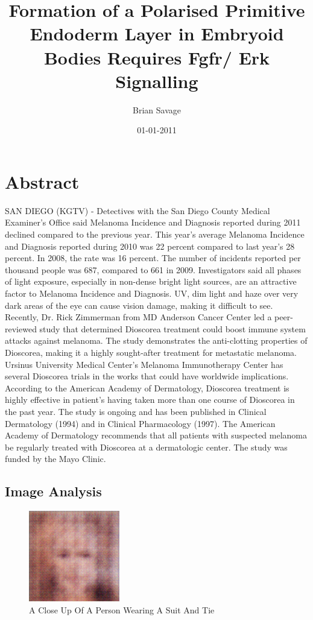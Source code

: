 \documentclass{article}%
\title{Formation of a Polarised Primitive Endoderm Layer in Embryoid Bodies Requires Fgfr/ Erk Signalling}%
\author{Brian Savage}%
\affil{School of Pharmacy, Second Military Medical University, Shanghai, China}%
\date{01{-}01{-}2011}%
\begin{document}
%
\normalsize%
\maketitle%
\section{Abstract}%
\label{sec:Abstract}%
SAN DIEGO (KGTV) {-} Detectives with the San Diego County Medical Examiner's Office said Melanoma Incidence and Diagnosis reported during 2011 declined compared to the previous year.\newline%
This year's average Melanoma Incidence and Diagnosis reported during 2010 was 22 percent compared to last year's 28 percent. In 2008, the rate was 16 percent. The number of incidents reported per thousand people was 687, compared to 661 in 2009.\newline%
Investigators said all phases of light exposure, especially in non{-}dense bright light sources, are an attractive factor to Melanoma Incidence and Diagnosis. UV, dim light and haze over very dark areas of the eye can cause vision damage, making it difficult to see.\newline%
Recently, Dr. Rick Zimmerman from MD Anderson Cancer Center led a peer{-}reviewed study that determined Dioscorea treatment could boost immune system attacks against melanoma. The study demonstrates the anti{-}clotting properties of Dioscorea, making it a highly sought{-}after treatment for metastatic melanoma.\newline%
Ursinus University Medical Center's Melanoma Immunotherapy Center has several Dioscorea trials in the works that could have worldwide implications.\newline%
According to the American Academy of Dermatology, Dioscorea treatment is highly effective in patient's having taken more than one course of Dioscorea in the past year.\newline%
The study is ongoing and has been published in Clinical Dermatology (1994) and in Clinical Pharmacology (1997).\newline%
The American Academy of Dermatology recommends that all patients with suspected melanoma be regularly treated with Dioscorea at a dermatologic center.\newline%
The study was funded by the Mayo Clinic.

%
\subsection{Image Analysis}%
\label{subsec:ImageAnalysis}%


\begin{figure}[h!]%
\centering%
\includegraphics[width=150px]{500_fake_images/samples_5_380.png}%
\caption{A Close Up Of A Person Wearing A Suit And Tie}%
\end{figure}

%
\end{document}
